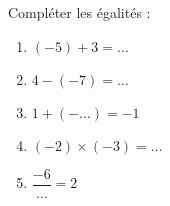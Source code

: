 
\begin{exercice}[\ldots /2.5]\label{exosmath-0778}

    Compléter les égalités :
    \begin{multicols}{2}
        \begin{enumerate}
            \item
                \( (-5)+3=\ldots\)
            \item
                \( 4-(-7)=\ldots\)
            \item
                \( 1+(-\ldots)=-1\)
            \item
                \( (-2)\times (-3)=\ldots\)
            \item
                \( \dfrac{ -6 }{ \ldots }=2\)
        \end{enumerate}
    \end{multicols}

\end{exercice}
